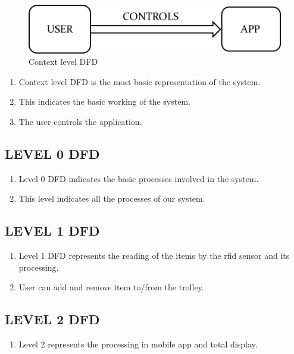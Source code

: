 \documentclass[11pt]{report} %
\begin{document}
\begin{figure}[h]
	\centering
	\includegraphics[width=0.5\linewidth]{figures/context_level_DFD.png}
	\caption{Context level DFD}
	\label{fig:Context level DFD}
\end{figure}


\begin{enumerate}
	\item Context level DFD is the most basic representation of the system.
	\item This indicates the basic working of the system.
	\item The user controls the application.
\end{enumerate}


\subsection{LEVEL 0 DFD}
\label{subsec:LEVEL 0 DFD}


\begin{enumerate}
	\item Level 0 DFD indicates the basic processes involved in the system.
	\item This level indicates all the processes of our system.
\end{enumerate}

\subsection{LEVEL 1 DFD}
\label{subsec:LEVEL 1 DFD}

\begin{enumerate}
	\item Level 1 DFD represents the reading of the items by the rfid sensor and its processing.
	\item User can add and remove item to/from the trolley.
\end{enumerate}

\subsection{LEVEL 2 DFD}
\label{subsec:LEVEL 2 DFD}


\begin{enumerate}
	\item Level 2 represents the processing in mobile app and total display.
\end{enumerate}
\end{document}
